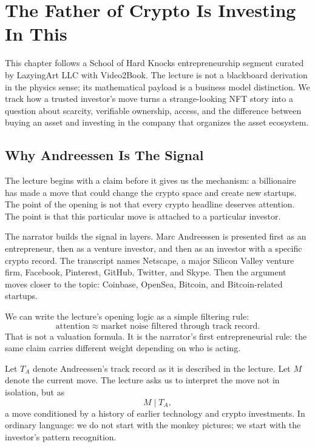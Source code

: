 \chapter{The Father of Crypto Is Investing In This}

This chapter follows a School of Hard Knocks entrepreneurship segment curated by LazyingArt LLC with Video2Book. The lecture is not a blackboard derivation in the physics sense; its mathematical payload is a business model distinction. We track how a trusted investor's move turns a strange-looking NFT story into a question about scarcity, verifiable ownership, access, and the difference between buying an asset and investing in the company that organizes the asset ecosystem.

\section{Why Andreessen Is The Signal}

The lecture begins with a claim before it gives us the mechanism: a billionaire has made a move that could change the crypto space and create new startups. The point of the opening is not that every crypto headline deserves attention. The point is that this particular move is attached to a particular investor.

The narrator builds the signal in layers. Marc Andreessen is presented first as an entrepreneur, then as a venture investor, and then as an investor with a specific crypto record. The transcript names Netscape, a major Silicon Valley venture firm, Facebook, Pinterest, GitHub, Twitter, and Skype. Then the argument moves closer to the topic: Coinbase, OpenSea, Bitcoin, and Bitcoin-related startups.

We can write the lecture's opening logic as a simple filtering rule:
\begin{equation}
\text{attention} \approx \text{market noise filtered through track record}.
\end{equation}
That is not a valuation formula. It is the narrator's first entrepreneurial rule: the same claim carries different weight depending on who is acting.

Let \(T_A\) denote Andreessen's track record as it is described in the lecture. Let \(M\) denote the current move. The lecture asks us to interpret the move not in isolation, but as
\begin{equation}
M \mid T_A,
\end{equation}
a move conditioned by a history of earlier technology and crypto investments. In ordinary language: we do not start with the monkey pictures; we start with the investor's pattern recognition.

